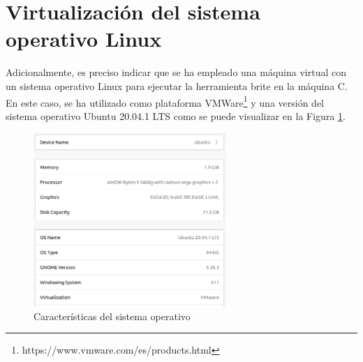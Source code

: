 \newpage

\section{Virtualización del sistema operativo Linux}
Adicionalmente, es preciso indicar que se ha empleado una máquina virtual con un sistema operativo Linux para ejecutar la herramienta \gls{brite} en la máquina C. En este caso, se ha utilizado como plataforma VMWare\footnote{https://www.vmware.com/es/products.html} y una versión del sistema operativo Ubuntu 20.04.1 LTS como se puede visualizar en la Figura \ref{fig:ubuntu}.

\vspace{3mm}

\begin{figure}[h!]
    \centering
    \includegraphics[width=0.65\textwidth]{img/anexos/ubuntu.PNG}
    \caption{Características del sistema operativo}
    \label{fig:ubuntu}
\end{figure}